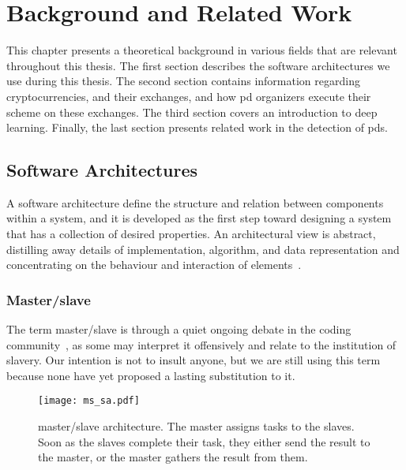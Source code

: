 
\chapter{Background and Related Work}\label{ch:background}\glsresetall
This chapter presents a theoretical background in various fields that are relevant throughout this thesis. The first section describes the software architectures we use during this thesis. The second section contains information regarding cryptocurrencies, and their exchanges, and how  \ac{pd} organizers execute their scheme on these exchanges. The third section covers an introduction to deep learning. Finally, the last section presents related work in the detection of \acp{pd}.

\section{Software Architectures}
A software architecture define the structure and relation between components within a system, and it is developed as the first step toward designing a system that has a collection of desired properties. An architectural view is abstract, distilling away details of implementation, algorithm, and data representation and concentrating on the behaviour and interaction of elements~\cite[p.~3]{bass2003software}.

\subsection{Master/slave}\label{sec:master_slave}
The term master/slave is through a quiet ongoing debate in the coding community~\cite{giz_master, reg_master, med_master}, as some may interpret it offensively and relate to the institution of slavery. Our intention is not to insult anyone, but we are still using this term because none have yet proposed a lasting substitution to it.

\begin{figure}[ht]
    \centering
    \texttt{[image: ms\_sa.pdf]}
    \caption[Architecture - Master/slave]{master/slave architecture. The master assigns tasks to the slaves. Soon as the slaves complete their task, they either send the result to the master, or the master gathers the result from them.}
    \label{fig:msa}
\end{figure}

